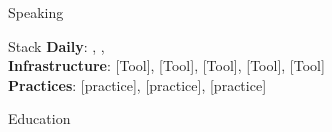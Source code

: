 \documentclass[fontset=commercial,pagefooter=false]{yuan2resume}
\begin{document}
\begin{cvtwocolumn}
\begin{cvsection}{Speaking}
\end{cvsection}

\begin{cvsection}{Stack}
  \textbf{Daily}: {\CodeFont{[Lang]}}, {\CodeFont{[Lang]}}, {\CodeFont{[Lang]}} \\
  \textbf{Infrastructure}: [Tool], [Tool], [Tool], [Tool], [Tool] \\
  \textbf{Practices}: [practice], [practice], [practice]
\end{cvsection}

\begin{cvsection}{Education}
\end{cvsection}

\end{cvtwocolumn}
\end{document}
